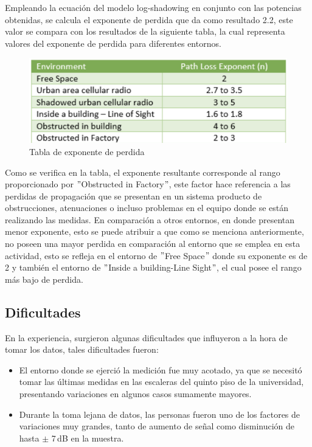   
  Empleando la ecuación del modelo log-shadowing en conjunto con las potencias obtenidas, se calcula el exponente de perdida que da como resultado 2.2, este valor se compara con los resultados de la siguiente tabla, la cual representa valores del exponente de perdida para diferentes entornos.
  
   \begin{figure}[H]
        \centering
        \includegraphics[width=\linewidth]{Imagenes/Captura de pantalla 2022-11-10 a la(s) 19.42.05.png}
        \caption{Tabla de exponente de perdida \cite{tabla}}
        \label{transmisor}
  \end{figure}
  
  Como se verifica en la tabla, el exponente resultante corresponde al rango proporcionado por $"$Obstructed in Factory$"$, este factor hace referencia a las perdidas de propagación que se presentan en un sistema producto de obstrucciones, atenuaciones o incluso problemas en el equipo donde se están realizando las medidas. En comparación a otros entornos, en donde presentan menor exponente, esto se puede atribuir a que como se menciona anteriormente, no poseen una mayor perdida en comparación al entorno que se emplea en esta actividad, esto se refleja en el entorno de $"$Free Space$"$ donde su exponente es de 2 y también el entorno de $"$Inside a building-Line Sight$"$, el cual posee el rango más bajo de perdida.
 
 


  
  \subsection{Dificultades}
  
 En la experiencia, surgieron algunas dificultades que influyeron a la hora de tomar los datos, tales dificultades fueron:
  
  \begin{itemize}
      \item El entorno donde se ejerció la medición fue muy acotado, ya que se necesitó tomar las últimas medidas en las escaleras del quinto piso de la universidad, presentando variaciones en algunos casos sumamente mayores.
      \item Durante la toma lejana de datos, las personas fueron uno de los factores de variaciones muy grandes, tanto de aumento de señal como disminución de hasta $\pm$ 7 dB en la muestra.
  \end{itemize}
  
  
  